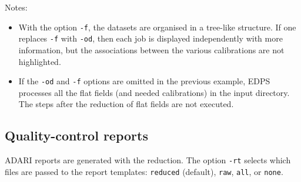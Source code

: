 Notes:

\begin{itemize}
\item With the option {\tt -f}, the datasets are organised in a tree-like structure. If one replaces {\tt -f} with {\tt -od}, then each job is displayed independently with more information, but the associations between the various calibrations are not highlighted.

\item If the {\tt -od} and {\tt -f} options are omitted in the previous example, EDPS processes all the flat fields (and needed calibrations) in the input directory. The steps after the reduction of flat fields are not executed.
\end{itemize}

\subsection{Quality-control reports}

ADARI reports are generated with the reduction. The option {\tt -rt} selects which files are passed to the report templates: {\tt reduced} (default), {\tt raw}, {\tt all}, or {\tt none}.

